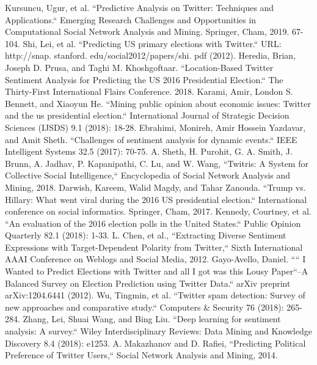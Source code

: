 \begin{thebibliography}{200}
\iffalse
{} Kursuncu, Ugur, et al. ``Predictive Analysis on Twitter: Techniques and Applications.`` Emerging Research Challenges and Opportunities in Computational Social Network Analysis and Mining. Springer, Cham, 2019. 67-104.\label{appendix:6.1}
 Shi, Lei, et al. ``Predicting US primary elections with Twitter.`` URL: http://snap. stanford. edu/social2012/papers/shi. pdf (2012).\label{appendix:6.2}
 Heredia, Brian, Joseph D. Prusa, and Taghi M. Khoshgoftaar. ``Location-Based Twitter Sentiment Analysis for Predicting the US 2016 Presidential Election.`` The Thirty-First International Flairs Conference. 2018.\label{appendix:6.3}
 Karami, Amir, London S. Bennett, and Xiaoyun He. ``Mining public opinion about economic issues: Twitter and the us presidential election.`` International Journal of Strategic Decision Sciences (IJSDS) 9.1 (2018): 18-28.\label{appendix:6.4}
 Ebrahimi, Monireh, Amir Hossein Yazdavar, and Amit Sheth. ``Challenges of sentiment analysis for dynamic events.`` IEEE Intelligent Systems 32.5 (2017): 70-75.\label{appendix:6.5}
 A. Sheth, H. Purohit, G. A. Smith, J. Brunn, A. Jadhav, P. Kapanipathi, C. Lu, and W. Wang, ``Twitris: A System for Collective Social Intelligence,`` Encyclopedia of Social Network Analysis and Mining, 2018.\label{appendix:6.6}
 Darwish, Kareem, Walid Magdy, and Tahar Zanouda. ``Trump vs. Hillary: What went viral during the 2016 US presidential election.`` International conference on social informatics. Springer, Cham, 2017.\label{appendix:6.7}
 Kennedy, Courtney, et al. ``An evaluation of the 2016 election polls in the United States.`` Public Opinion Quarterly 82.1 (2018): 1-33.\label{appendix:6.8}
 L. Chen, et al., ``Extracting Diverse Sentiment Expressions with Target-Dependent Polarity from Twitter,`` Sixth International AAAI Conference on Weblogs and Social Media, 2012.\label{appendix:6.9}
 Gayo-Avello, Daniel. ```` I Wanted to Predict Elections with Twitter and all I got was this Lousy Paper``--A Balanced Survey on Election Prediction using Twitter Data.`` arXiv preprint arXiv:1204.6441 (2012).\label{appendix:6.10}
 Wu, Tingmin, et al. ``Twitter spam detection: Survey of new approaches and comparative study.`` Computers \& Security 76 (2018): 265-284.\label{appendix:6.11}
 Zhang, Lei, Shuai Wang, and Bing Liu. ``Deep learning for sentiment analysis: A survey.`` Wiley Interdisciplinary Reviews: Data Mining and Knowledge Discovery 8.4 (2018): e1253.\label{appendix:6.13}
 A. Makazhanov and D. Rafiei, ``Predicting Political Preference of Twitter Users,`` Social Network Analysis and Mining, 2014.\label{appendix:6.14}

\end{thebibliography}
